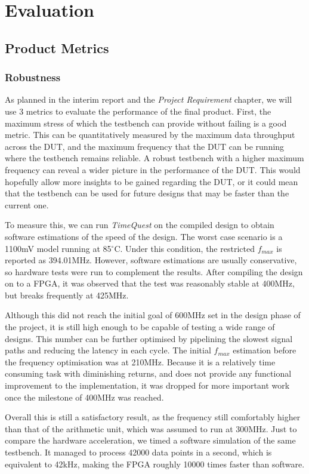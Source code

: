 \chapter{Evaluation}

\section{Product Metrics}
\subsection{Robustness}
As planned in the interim report and the \textit{Project Requirement} chapter, we will use 3 metrics to evaluate the performance of the final product.
First, the maximum stress of which the testbench can provide without failing is a good metric.
This can be quantitatively measured by the maximum data throughput across the DUT, and the maximum frequency that the DUT can be running where the testbench remains reliable.
A robust testbench with a higher maximum frequency can reveal a wider picture in the performance of the DUT.
This would hopefully allow more insights to be gained regarding the DUT, or it could mean that the testbench can be used for future designs that may be faster than the current one.

To measure this, we can run \textit{TimeQuest} on the compiled design to obtain software estimations of the speed of the design.
The worst case scenario is a 1100mV model running at 85$^\circ$C.
Under this condition, the restricted $f_{max}$ is reported as 394.01MHz.
However, software estimations are usually conservative, so hardware tests were run to complement the results.
After compiling the design on to a FPGA, it was observed that the test was reasonably stable at 400MHz, but breaks frequently at 425MHz.

Although this did not reach the initial goal of 600MHz set in the design phase of the project, it is still high enough to be capable of testing a wide range of designs.
This number can be further optimised by pipelining the slowest signal paths and reducing the latency in each cycle.
The initial $f_{max}$ estimation before the frequency optimisation was at 210MHz.
Because it is a relatively time consuming task with diminishing returns, and does not provide any functional improvement to the implementation, it was dropped for more important work once the milestone of 400MHz was reached.

Overall this is still a satisfactory result, as the frequency still comfortably higher than that of the arithmetic unit, which was assumed to run at 300MHz.
Just to compare the hardware acceleration, we timed a software simulation of the same testbench.
It managed to process 42000 data points in a second, which is equivalent to 42kHz, making the FPGA roughly 10000 times faster than software.

